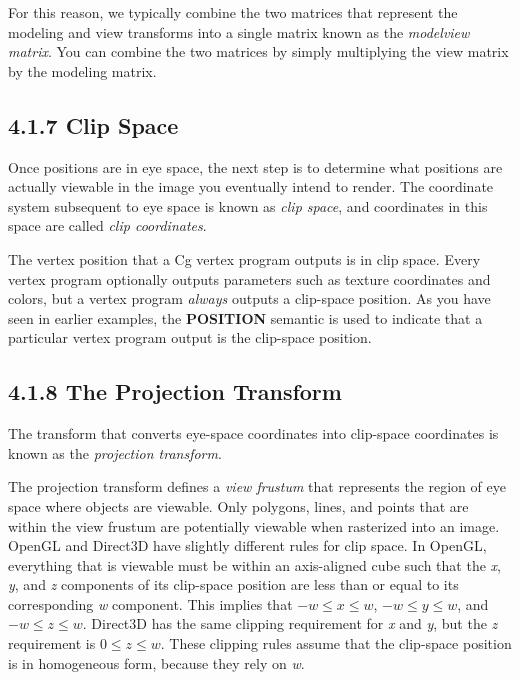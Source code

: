 \documentclass{book}
\begin{document}
For this reason, we typically combine the two matrices that represent the modeling and view transforms into a single matrix known as the \textit{modelview matrix}. You can combine the two matrices by simply multiplying the view matrix by the modeling matrix.

\subsection{4.1.7 Clip Space}

Once positions are in eye space, the next step is to determine what positions are actually viewable in the image you eventually intend to render. The coordinate system subsequent to eye space is known as \textit{clip space}, and coordinates in this space are called \textit{clip coordinates}.

The vertex position that a Cg vertex program outputs is in clip space. Every vertex program optionally outputs parameters such as texture coordinates and colors, but a vertex program \textit{always} outputs a clip-space position. As you have seen in earlier examples, the \textbf{POSITION} semantic is used to indicate that a particular vertex program output is the clip-space position.

\subsection{4.1.8 The Projection Transform}

The transform that converts eye-space coordinates into clip-space coordinates is known as the \textit{projection transform}.

The projection transform defines a \textit{view frustum} that represents the region of eye space where objects are viewable. Only polygons, lines, and points that are within the view frustum are potentially viewable when rasterized into an image. OpenGL and Direct3D have slightly different rules for clip space. In OpenGL, everything that is viewable must be within an axis-aligned cube such that the \textit{x}, \textit{y}, and \textit{z} components of its clip-space position are less than or equal to its corresponding \textit{w} component. This implies that $-w \leq x \leq w$, $-w \leq y \leq w$, and $-w \leq z \leq w$. Direct3D has the same clipping requirement for \textit{x} and \textit{y}, but the \textit{z} requirement is $0 \leq z \leq w$. These clipping rules assume that the clip-space position is in homogeneous form, because they rely on \textit{w}.
\end{document}
